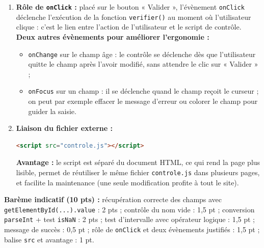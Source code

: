 \documentclass[11pt]{article}
\begin{document}
\begin{corrige}
\begin{enumerate}
\begin{lstlisting}[language=JavaScript]
  // Controle 1 : le nom est obligatoire
  if (nom == "") {
    zone.textContent = "Erreur : le nom est obligatoire.";
    return;                       // on arrete la fonction
  }
  // Controle 2 : l'age doit etre un nombre entier
  var age = parseInt(ageSaisi);
  if (isNaN(age)) {
    zone.textContent = "Erreur : l'age doit etre un nombre.";
    return;
  }
  // Controle 3 : l'age doit etre dans l'intervalle [17 ; 25]
  if (age < 17 || age > 25) {
    zone.textContent =
      "Erreur : l'age doit etre compris entre 17 et 25 ans.";
    return;
  }
  // Tous les controles sont passes
  zone.textContent = "Inscription validee. Bienvenue !";
}
\end{lstlisting}
La condition « hors intervalle » s'écrit \texttt{age < 17 || age > 25} (opérateur OU) ; de façon équivalente, la condition de validité est \texttt{age >= 17 \&\& age <= 25} (opérateur ET). \textbf{Vérification :} âge 17 $\to$ accepté (borne incluse) ; âge 25 $\to$ accepté ; âge 16 ou 26 $\to$ refusé.
\item \textbf{Rôle de \texttt{onClick} :} placé sur le bouton « Valider », l'évènement \texttt{onClick} déclenche l'exécution de la fonction \texttt{verifier()} au moment où l'utilisateur clique : c'est le lien entre l'action de l'utilisateur et le script de contrôle.\\
\textbf{Deux autres évènements pour améliorer l'ergonomie :}
\begin{itemize}
\item \texttt{onChange} sur le champ âge : le contrôle se déclenche dès que l'utilisateur quitte le champ après l'avoir modifié, sans attendre le clic sur « Valider » ;
\item \texttt{onFocus} sur un champ : il se déclenche quand le champ reçoit le curseur ; on peut par exemple effacer le message d'erreur ou colorer le champ pour guider la saisie.
\end{itemize}
\item \textbf{Liaison du fichier externe :}
\begin{lstlisting}[language=HTML]
<script src="controle.js"></script>
\end{lstlisting}
\textbf{Avantage :} le script est séparé du document HTML, ce qui rend la page plus lisible, permet de réutiliser le même fichier \texttt{controle.js} dans plusieurs pages, et facilite la maintenance (une seule modification profite à tout le site).
\end{enumerate}
\textbf{Barème indicatif (10 pts) :} récupération correcte des champs avec \texttt{getElementById(...).value} : 2 pts ; contrôle du nom vide : 1,5 pt ; conversion \texttt{parseInt} + test \texttt{isNaN} : 2 pts ; test d'intervalle avec opérateur logique : 1,5 pt ; message de succès : 0,5 pt ; rôle de \texttt{onClick} et deux évènements justifiés : 1,5 pt ; balise \texttt{src} et avantage : 1 pt.\\

\end{corrige}
\end{document}
